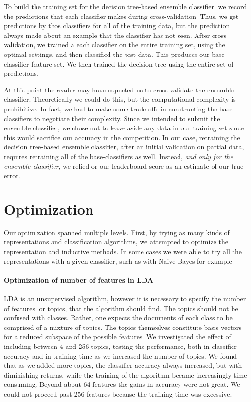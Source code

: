 \documentclass[conference,letterpaper]{IEEEtran}
\begin{document}
To build the training set for the decision tree-based ensemble classifier,
we record the predictions that each classifier makes during cross-validation.
Thus, we get predictions by thos classifiers for all of the training data,
but the prediction always made about an example that the classifier has 
not seen.  After cross validation, we trained a each classifier on the
entire training set, using the optimal settings, and then classified the test
data.  This produces our base-classifier feature set.  We then  
trained the decision tree using the entire set of predictions.

At this point the reader may have expected us to cross-validate the 
ensemble classifier.  Theoretically we could do this, but the computational
complexity is prohibitive.  In fact, we had to make some trade-offs in 
constructing the base classifiers to negotiate their complexity.  Since we
intended to submit the ensemble classifier, we chose not to leave aside any
data in our training set since this would sacrifice our accuracy in the
competition.  In our case, retraining the decision tree-based ensemble
classifier, after an initial validation on partial data, requires
retraining all of the base-classifiers as well.  Instead, 
\textit{and only for the ensemble classifier}, we relied or our leaderboard 
score as an estimate of our true error.

\section{Optimization}
Our optimization spanned multiple levels.  First, by trying as many kinds
of representations and classification algorithms, we attempted to optimize 
the representation and inductive methods.  In some cases we were able to try
all the representations with a given classifier, such as with Naive Bayes for 
example.

\paragraph{Optimization of number of features in LDA}
LDA is an unsupervised algorithm, however it is necessary to specify the 
number of features, or topics, that the algorithm should find.  The topics
should not be confused with classes.  Rather, one expects the documents of 
each class to be comprised of a mixture of topics.  The topics themselves 
constitute basis vectors for a reduced subspace of the possible features.
We investigated the effect of including between 4 and 256 topics, testing the
performance, both in classifier accuracy and in training time as we increased
the number of topics.  We found that as we added more topics, the classifier
accuracy always increased, but with diminishing returns, while the training
of the algorithm became increasingly time consuming.  Beyond about 64 features
the gains in accuracy were not great.  We could not proceed past 256 features
because the training time was excessive.
\end{document}
